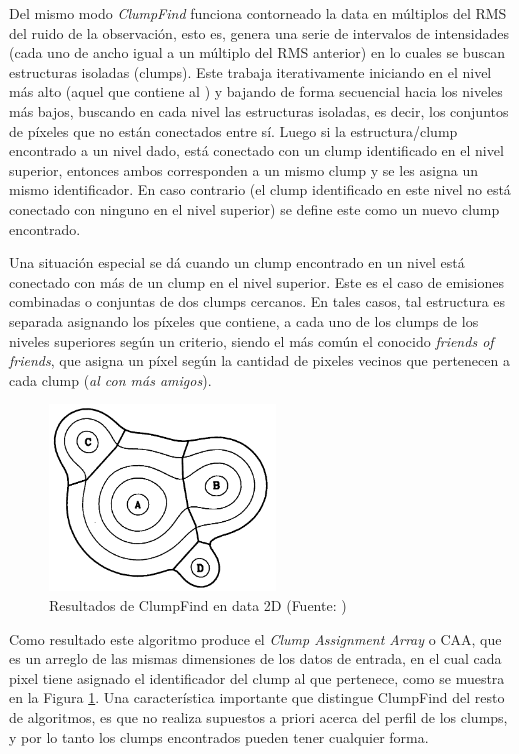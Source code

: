 Del mismo modo \textit{ClumpFind} funciona contorneado la data en múltiplos del RMS del ruido de la observación, esto es, genera una serie de intervalos de intensidades (cada uno de ancho igual a un múltiplo del RMS anterior) en lo cuales se buscan estructuras isoladas (clumps). Este trabaja iterativamente iniciando en el nivel más alto (aquel que contiene al ) y bajando de forma secuencial hacia los niveles más bajos, buscando en cada nivel las estructuras isoladas, es decir, los conjuntos de píxeles que no están conectados entre sí. Luego si la estructura/clump encontrado a un nivel dado, está conectado con un clump identificado en el nivel superior, entonces ambos corresponden a un mismo clump y se les asigna un mismo identificador. En caso contrario (el clump identificado en este nivel no está conectado con ninguno en el nivel superior) se define este como un nuevo clump encontrado.

Una situación especial se dá cuando un clump encontrado en un nivel está conectado con más de un clump en el nivel superior. Este es el caso de emisiones combinadas o conjuntas de dos clumps cercanos. En tales casos, tal estructura es separada asignando los píxeles que contiene, a cada uno de los clumps de los niveles superiores según un criterio, siendo el más común el conocido \textit{friends of friends}, que asigna un píxel según la cantidad de pixeles vecinos que pertenecen a cada clump (\textit{al con más amigos}).

\begin{figure}[htpb!]
\centering
\includegraphics[width=6cm]{cf}
\caption{Resultados de ClumpFind en data 2D (Fuente: \cite{Williams})}
\label{fig:cf}
\end{figure}

Como resultado este algoritmo produce el \textit{Clump Assignment Array} o CAA, que es un arreglo de las mismas dimensiones de los datos de entrada, en el cual cada pixel tiene asignado el identificador del clump al que pertenece, como se muestra en la Figura \ref{fig:cf}. Una característica importante que distingue ClumpFind del resto de algoritmos, es que no realiza supuestos a priori acerca del perfil de los clumps, y por lo tanto los clumps encontrados pueden tener cualquier forma.



